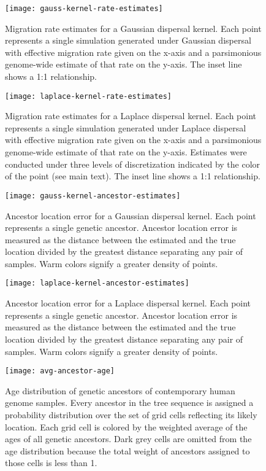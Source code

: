 \begin{figure}[h]
\centering
\texttt{[image: gauss-kernel-rate-estimates]}
\caption{Migration rate estimates for a Gaussian dispersal kernel. Each point
represents a single simulation generated under Gaussian dispersal with effective
migration rate given on the x-axis and a parsimonious genome-wide estimate of that
rate on the y-axis. The inset line shows a 1:1 relationship.
}
\label{fig:gauss-kernel-rate-estimates}
\end{figure}

\begin{figure}[h]
\centering
\texttt{[image: laplace-kernel-rate-estimates]}
\caption{Migration rate estimates for a Laplace dispersal kernel. Each point
represents a single simulation generated under Laplace dispersal with effective
migration rate given on the x-axis and a parsimonious genome-wide estimate of
that rate on the y-axis. Estimates were conducted under three levels of 
discretization indicated by the color of the point (see main text).
The inset line shows a 1:1 relationship.
}
\label{fig:lapl-kernel-rate-estimates}
\end{figure}

\begin{figure}[h]
\centering
\texttt{[image: gauss-kernel-ancestor-estimates]}
\caption{Ancestor location error for a Gaussian dispersal kernel. Each point
represents a single genetic ancestor. Ancestor location error is measured as
the distance between the estimated and the true location divided by the greatest
distance separating any pair of samples. Warm colors signify a greater density
of points.
}
\label{fig:gauss-kernel-ancestor-estimates}
\end{figure}

\begin{figure}[h]
\centering
\texttt{[image: laplace-kernel-ancestor-estimates]}
\caption{Ancestor location error for a Laplace dispersal kernel. Each point
represents a single genetic ancestor. Ancestor location error is measured as
the distance between the estimated and the true location divided by the greatest
distance separating any pair of samples. Warm colors signify a greater density
of points.
}
\label{fig:lapl-kernel-ancestor-estimates}
\end{figure}

\begin{figure}[h]
\centering
\texttt{[image: avg-ancestor-age]}
\caption{Age distribution of genetic ancestors of contemporary human genome
samples. Every ancestor in the tree sequence is assigned a probability distribution 
over the set of grid cells reflecting its likely location. Each grid cell is 
colored by the weighted average of the ages of all genetic ancestors. Dark grey 
cells are omitted from the age distribution because the total weight of ancestors 
assigned to those cells is less than 1.}
\label{fig:avg-ancestor-age}
\end{figure}